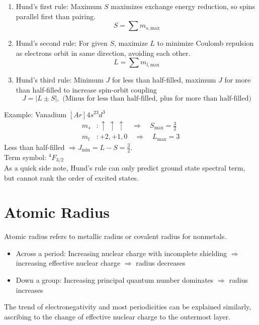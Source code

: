 \begin{enumerate}
    \item Hund's first rule: Maximum $S$ maximizes exchange energy reduction, so spins parallel first than pairing.
    \[
        S = \sum m_{s,\text{max}}
    \]
    
    \item Hund's second rule: For given $S$, maximize $L$ to minimize Coulomb repulsion as electrons orbit in same direction, avoiding each other.
    \[
        L = \sum m_{l,\text{max}}
    \]
    
    \item Hund's third rule: Minimum $J$ for less than half-filled, maximum $J$ for more than half-filled to increase spin-orbit coupling
    \[
        J = |L \pm S|,\text{ (Minus for less than half-filled, plus for more than half-filled)}
    \] 
\end{enumerate}
Example: Vanadium $[Ar]4s^23d^3$
\begin{align*}
    m_s &: \uparrow\ \uparrow\ \uparrow \quad \Rightarrow \quad S_{\text{max}} = \frac{3}{2} \\
    m_l &: +2, +1, 0 \quad \Rightarrow \quad L_{\text{max}} = 3
\end{align*}
Less than half-filled $\Rightarrow J_{\text{min}} = L - S = \frac{3}{2}$.\\
Term symbol: $\boxed{{}^4\!F_{3/2}}$\\
As a quick side note, Hund's rule can only predict ground state spectral term, but cannot rank the order of excited states. \\


\section{Atomic Radius}

Atomic radius refers to metallic radius or covalent radius for nonmetals.
\begin{itemize}
    \item Across a period: Increasing nuclear charge with incomplete shielding $\Rightarrow$ increasing effective nuclear charge $\Rightarrow$ radius decreases
    \item Down a group: Increasing principal quantum number dominates $\Rightarrow$ radius increases
\end{itemize}
The trend of electronegativity and most periodicities can be explained similarly, 
ascribing to the change of effective nuclear charge to the outermost layer.

